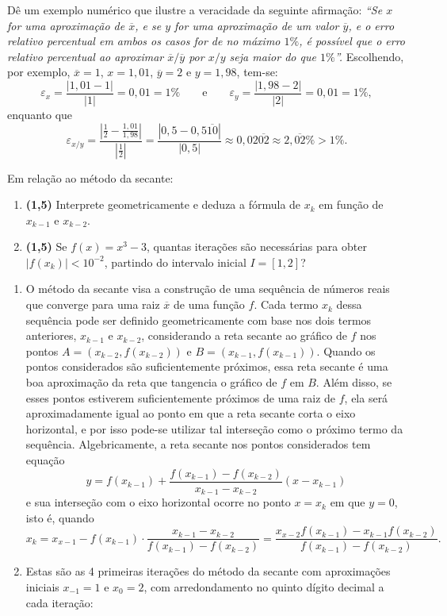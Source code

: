 \documentclass[12pt,a4paper]{article}
\begin{document}
\begin{ExerciseList}

\Exercise[title={1,0}]
Dê um exemplo numérico que ilustre a veracidade da seguinte afirmação: \textit{ ``Se $x$ for uma aproximação de $\overline{x}$, e se $y$ for uma aproximação de um valor $\overline{y}$, e o erro relativo percentual em ambos os casos for de no máximo $1\%$, é possível que o erro relativo percentual ao aproximar $\overline{x} / \overline{y}$ por $x/y$ seja maior do que $1\%$''. }
\Answer
Escolhendo, por exemplo,
$\overline{x} = 1$,
$x = 1,01$,
$\overline{y} = 2$ e
$y = 1,98$, tem-se:
\[
\varepsilon_x = \frac{|1,01 - 1|}{|1|} = 0,01 = 1\%
\qquad\text{e}\qquad
\varepsilon_y = \frac{|1,98 - 2|}{|2|} = 0,01 = 1\%,
\]
enquanto que
\[
\varepsilon_{x/y}
= \frac{\left|\frac{1}{2} - \frac{1,01}{1,98}\right|}{\left|\frac{1}{2}\right|}
= \frac{\left|0,5 - 0,5\overline{10}\right|}{|0,5|}
\approx 0,02\overline{02}
\approx 2,\overline{02}\% > 1\%.
\]

\Exercise%
Em relação ao método da secante:
\begin{enumerate}
\item \textbf{(1,5)} Interprete geometricamente e deduza a fórmula de $x_{k}$ em função de $x_{k-1}$ e $x_{k-2}$.
\item \textbf{(1,5)} Se $f(x) = x^3 - 3$, quantas iterações são necessárias para obter $|f(x_k)| < 10^{-2}$, partindo do intervalo inicial $I = [1, 2]$?
\end{enumerate}
\Answer
\begin{enumerate}
\item O método da secante visa a construção de uma sequência de números reais que converge para uma raiz $\overline{x}$ de uma função $f$. Cada termo $x_k$ dessa sequência pode ser definido geometricamente com base nos dois termos anteriores, $x_{k-1}$ e $x_{k-2}$, considerando a reta secante ao gráfico de $f$ nos pontos $A = (x_{k-2}, f(x_{k-2}))$ e $B = (x_{k-1}, f(x_{k-1}))$. Quando os pontos considerados são suficientemente próximos, essa reta secante é uma boa aproximação da reta que tangencia o gráfico de $f$ em $B$. Além disso, se esses pontos estiverem suficientemente próximos de uma raiz de $f$, ela será aproximadamente igual ao ponto em que a reta secante corta o eixo horizontal, e por isso pode-se utilizar tal interseção como o próximo termo da sequência. Algebricamente, a reta secante nos pontos considerados tem equação
\[
y = f(x_{k-1}) + \frac{f(x_{k-1}) - f(x_{k-2})}
                      {  x_{k-1}  -   x_{k-2}} (x - x_{k-1})
\]
e sua interseção com o eixo horizontal ocorre no ponto $x = x_k$ em que $y = 0$, isto é, quando
\[
x_k
= x_{x-1} - f(x_{k-1})\cdot \frac{  x_{k-1}  -   x_{k-2}}
                                 {f(x_{k-1}) - f(x_{k-2})}
= \frac{x_{x-2}f(x_{k-1}) - x_{k-1} f(x_{k-2}) }
       {f(x_{k-1})        - f(x_{k-2})}.
\]
\item Estas são as 4 primeiras iterações do método da secante com aproximações iniciais $x_{-1} = 1$ e $x_{0} = 2$, com arredondamento no quinto dígito decimal a cada iteração:


\end{enumerate}
\end{ExerciseList}
\end{document}
